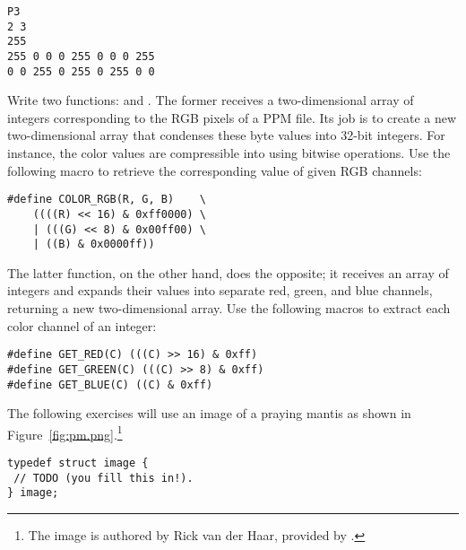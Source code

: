 \begin{verbatim}
P3
2 3
255
255 0 0 0 255 0 0 0 255
0 0 255 0 255 0 255 0 0
\end{verbatim}
Write two functions:  and . The former receives a two-dimensional array of integers corresponding to the RGB pixels of a PPM file. Its job is to create a new two-dimensional array that condenses these byte values into 32-bit integers. For instance, the color values  are compressible into  using bitwise operations. Use the following macro to retrieve the corresponding value of given RGB channels:
\begin{cl}[]{}
\begin{lstlisting}[language=MyC]
#define COLOR_RGB(R, G, B)    \
    ((((R) << 16) & 0xff0000) \
    | (((G) << 8) & 0x00ff00) \
    | ((B) & 0x0000ff))     
\end{lstlisting}
\end{cl}
The latter  function, on the other hand, does the opposite; it receives an array of integers and expands their values into separate red, green, and blue channels, returning a new two-dimensional array. Use the following macros to extract each color channel of an integer:
\begin{cl}[]{}
\begin{lstlisting}[language=MyC]
#define GET_RED(C) (((C) >> 16) & 0xff)
#define GET_GREEN(C) (((C) >> 8) & 0xff)
#define GET_BLUE(C) ((C) & 0xff)
\end{lstlisting}
\end{cl}
\noindent The following exercises will use an image of a praying mantis as shown in Figure~\ref{fig:pm.png}.\footnote{The image is authored by Rick van der Haar, provided by .}

\begin{cl}[]{}
\begin{lstlisting}[language=MyC]
typedef struct image {
 // TODO (you fill this in!).
} image;
\end{lstlisting}
\end{cl}

